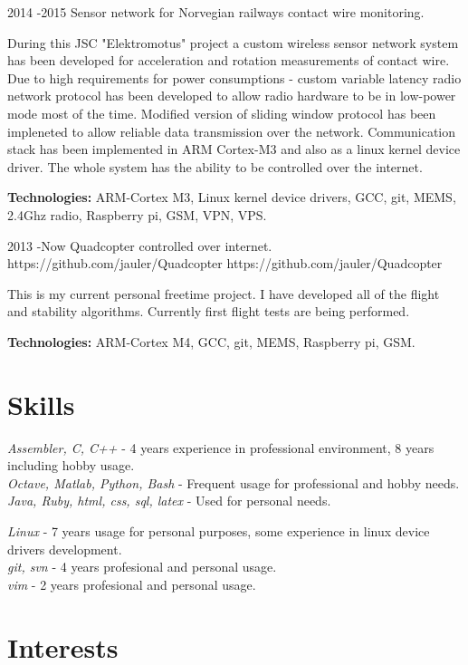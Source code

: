 \documentclass[12]{article}
\begin{document}
\job
{2014 -}{2015}
{Sensor network for Norvegian railways contact wire monitoring.}
{}
{}
{
During this JSC "Elektromotus" project a custom wireless sensor network system has been developed for acceleration and rotation measurements of contact wire.
Due to high requirements for power consumptions - custom variable latency radio network protocol has been developed to allow radio hardware to be in low-power mode most of the time.
Modified version of sliding window protocol has been impleneted to allow reliable data transmission over the network.
Communication stack has been implemented in ARM Cortex-M3 and also as a linux kernel device driver.
The whole system has the ability to be controlled over the internet.\\
\rule{0mm}{5mm}\textbf{Technologies:} ARM-Cortex M3, Linux kernel device drivers, GCC, git, MEMS, 2.4Ghz radio, Raspberry pi, GSM, VPN, VPS.}

\job
{2013 -}{Now}
{Quadcopter controlled over internet.}
{https://github.com/jauler/Quadcopter}
{https://github.com/jauler/Quadcopter}
{
This is my current personal freetime project.
I have developed all of the flight and stability algorithms.
Currently first flight tests are being performed.\\
\rule{0mm}{5mm}\textbf{Technologies:} ARM-Cortex M4, GCC, git, MEMS, Raspberry pi, GSM.}


\section{Skills}

{
	\textit{Assembler, C, C++} - 4 years experience in professional environment, 8 years including hobby usage.\\
	\textit{Octave, Matlab, Python, Bash} - Frequent usage for professional and hobby needs.\\
	\textit{Java, Ruby, html, css, sql, latex} - Used for personal needs. \\

}

{
	\textit{Linux} - 7 years usage for personal purposes, some experience in linux device drivers development.\\
	\textit{git, svn} - 4 years profesional and personal usage.\\
	\textit{vim} - 2 years profesional and personal usage.\\
}


\section{Interests}

\end{document}
